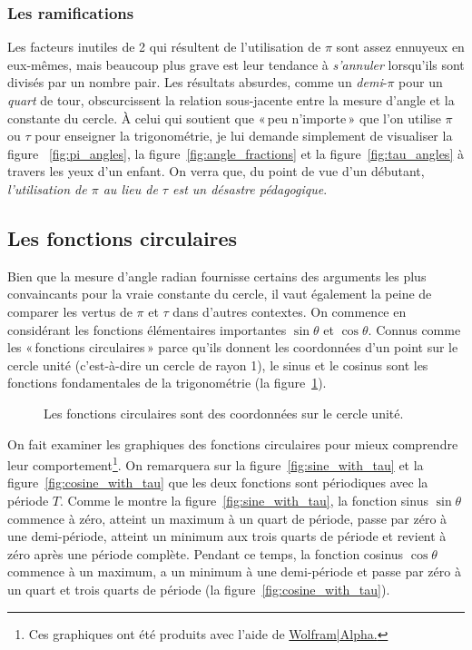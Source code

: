     \subsubsection{Les ramifications} %
    \label{sec:the_ramifications}


Les facteurs inutiles de 2 qui résultent de l'utilisation de $\pi$ sont assez ennuyeux en eux-mêmes, mais beaucoup plus grave est leur tendance à \emph{s'annuler} lorsqu'ils sont divisés par un nombre pair. Les résultats absurdes, comme un \emph{demi}-$\pi$ pour un \emph{quart} de tour, obscurcissent la relation sous-jacente entre la mesure d'angle et la constante du cercle. À celui qui soutient que «\,peu n'importe\,» que l'on utilise $\pi$ ou $\tau$ pour enseigner la trigonométrie, je lui demande simplement de visualiser la figure ~\ref{fig:pi_angles}, la figure~\ref{fig:angle_fractions} et la figure~\ref{fig:tau_angles} à travers les yeux d'un enfant. On verra que, du point de vue d'un débutant, \emph{l'utilisation de $\pi$ au lieu de $\tau$ est un désastre pédagogique}.

  \subsection{Les fonctions circulaires} %
  \label{sec:the_circle_functions}

Bien que la mesure d'angle radian fournisse certains des arguments les plus convaincants pour la vraie constante du cercle, il vaut également la peine de comparer les vertus de $\pi$ et $\tau$ dans d'autres contextes. On commence en considérant les fonctions élémentaires importantes $\sin\theta$ et $\cos\theta$. Connus comme les «\,fonctions circulaires\,» parce qu'ils donnent les coordonnées d'un point sur le cercle unité (c'est-à-dire un cercle de rayon 1), le sinus et le cosinus sont les fonctions fondamentales de la trigonométrie (la figure~\ref{fig:circle_functions}).

\begin{figure}
\begin{center}
\end{center}
\caption{Les fonctions circulaires sont des coordonnées sur le cercle unité.\label{fig:circle_functions}}
\end{figure}

On fait examiner les graphiques des fonctions circulaires pour mieux comprendre leur comportement\footnote{Ces graphiques ont été produits avec l'aide de \href{https://www.wolframalpha.com/}{Wolfram|Alpha.}}. On remarquera sur la figure~\ref{fig:sine_with_tau} et la figure~\ref{fig:cosine_with_tau} que les deux fonctions sont périodiques avec la période $T$. Comme le montre la figure~\ref{fig:sine_with_tau}, la fonction sinus $\sin\theta$ commence à zéro, atteint un maximum à un quart de période, passe par zéro à une demi-période, atteint un minimum aux trois quarts de période et revient à zéro après une période complète. Pendant ce temps, la fonction cosinus $\cos\theta$ commence à un maximum, a un minimum à une demi-période et passe par zéro à un quart et trois quarts de période (la figure~\ref{fig:cosine_with_tau}).

